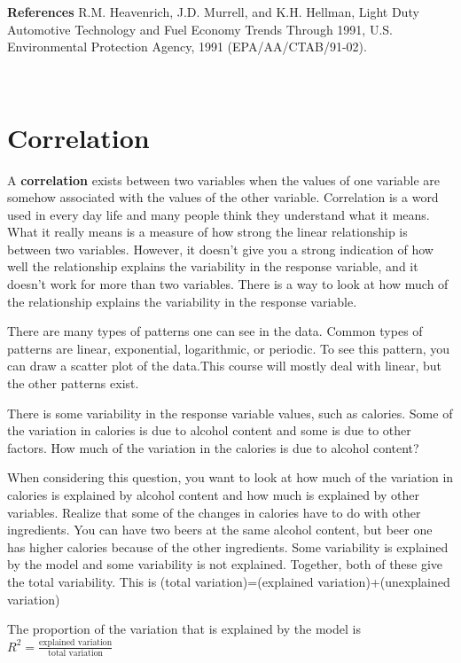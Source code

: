 \documentclass[]{book}
\begin{document}
\textbf{References}
R.M. Heavenrich, J.D. Murrell, and K.H. Hellman, Light Duty Automotive
Technology and Fuel Economy Trends Through 1991, U.S. Environmental Protection
Agency, 1991 (EPA/AA/CTAB/91-02).

\textbf{\\
}

\hypertarget{correlation}{%
\section{Correlation}\label{correlation}}

A \textbf{correlation} exists between two variables when the values of one variable are somehow associated with the values of the other variable. Correlation is a word used in every day life and many people think they understand what it means. What it really means is a measure of how strong the linear relationship is between two variables. However, it doesn't give you a strong indication of how well the relationship explains the variability in the response variable, and it doesn't work for more than two variables. There is a way to look at how much of the relationship explains the variability in the response variable.

There are many types of patterns one can see in the data. Common types of patterns are linear, exponential, logarithmic, or periodic. To see this pattern, you can draw a scatter plot of the data.This course will mostly deal with linear, but the other patterns exist.

There is some variability in the response variable values, such as calories. Some of the variation in calories is due to alcohol content and some is due to other factors. How much of the variation in the calories is due to alcohol content?

When considering this question, you want to look at how much of the variation in calories is explained by alcohol content and how much is explained by other variables. Realize that some of the changes in calories have to do with other ingredients. You can have two beers at the same alcohol content, but beer one has higher calories because of the other ingredients. Some variability is explained by the model and some variability is not explained. Together, both of these give the total variability. This is (total variation)=(explained variation)+(unexplained variation)

The proportion of the variation that is explained by the model is \(R^2=\frac{\text{explained variation}}{\text{total variation}}\)
\end{document}

